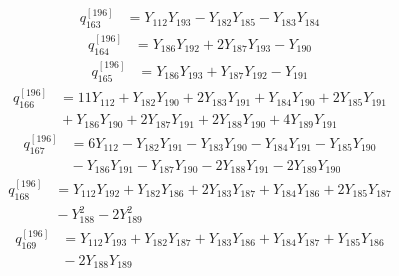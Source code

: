 \begin{equation}\label{q196:row:163}
\begin{aligned}
q_{163}^{[196]} &={} Y_{112}Y_{193} - Y_{182}Y_{185} - Y_{183}Y_{184}
\end{aligned}
\end{equation}
\begin{equation}\label{q196:row:164}
\begin{aligned}
q_{164}^{[196]} &={} Y_{186}Y_{192} + 2Y_{187}Y_{193} - Y_{190}
\end{aligned}
\end{equation}
\begin{equation}\label{q196:row:165}
\begin{aligned}
q_{165}^{[196]} &={} Y_{186}Y_{193} + Y_{187}Y_{192} - Y_{191}
\end{aligned}
\end{equation}
\begin{equation}\label{q196:row:166}
\begin{aligned}
q_{166}^{[196]} &={} 11Y_{112} + Y_{182}Y_{190} + 2Y_{183}Y_{191} + Y_{184}Y_{190} + 2Y_{185}Y_{191}\\
&{} + Y_{186}Y_{190} + 2Y_{187}Y_{191} + 2Y_{188}Y_{190} + 4Y_{189}Y_{191}
\end{aligned}
\end{equation}
\begin{equation}\label{q196:row:167}
\begin{aligned}
q_{167}^{[196]} &={} 6Y_{112} - Y_{182}Y_{191} - Y_{183}Y_{190} - Y_{184}Y_{191} - Y_{185}Y_{190}\\
&{} - Y_{186}Y_{191} - Y_{187}Y_{190} - 2Y_{188}Y_{191} - 2Y_{189}Y_{190}
\end{aligned}
\end{equation}
\begin{equation}\label{q196:row:168}
\begin{aligned}
q_{168}^{[196]} &={} Y_{112}Y_{192} + Y_{182}Y_{186} + 2Y_{183}Y_{187} + Y_{184}Y_{186} + 2Y_{185}Y_{187}\\
&{} - Y_{188}^{2} - 2Y_{189}^{2}
\end{aligned}
\end{equation}
\begin{equation}\label{q196:row:169}
\begin{aligned}
q_{169}^{[196]} &={} Y_{112}Y_{193} + Y_{182}Y_{187} + Y_{183}Y_{186} + Y_{184}Y_{187} + Y_{185}Y_{186}\\
&{} - 2Y_{188}Y_{189}
\end{aligned}
\end{equation}
